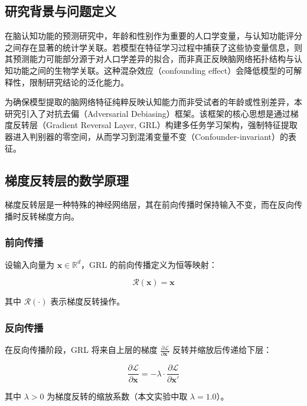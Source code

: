 \documentclass[UTF8, a4paper, 12pt]{article}
\begin{document}
\subsection{研究背景与问题定义}

在脑认知功能的预测研究中，年龄和性别作为重要的人口学变量，与认知功能评分之间存在显著的统计学关联。若模型在特征学习过程中捕获了这些协变量信息，则其预测能力可能部分源于对人口学差异的拟合，而非真正反映脑网络拓扑结构与认知功能之间的生物学关联。这种混杂效应（confounding effect）会降低模型的可解释性，限制研究结论的泛化能力。

为确保模型提取的脑网络特征纯粹反映认知能力而非受试者的年龄或性别差异，本研究引入了对抗去偏（Adversarial Debiasing）框架。该框架的核心思想是通过梯度反转层（Gradient Reversal Layer, GRL）构建多任务学习架构，强制特征提取器进入判别器的零空间，从而学习到混淆变量不变（Confounder-invariant）的表征。

\subsection{梯度反转层的数学原理}

梯度反转层是一种特殊的神经网络层，其在前向传播时保持输入不变，而在反向传播时反转梯度方向。

\subsubsection{前向传播}

设输入向量为 $\mathbf{x} \in \mathbb{R}^d$，GRL 的前向传播定义为恒等映射：

\begin{equation}
\mathcal{R}(\mathbf{x}) = \mathbf{x}
\end{equation}

其中 $\mathcal{R}(\cdot)$ 表示梯度反转操作。

\subsubsection{反向传播}

在反向传播阶段，GRL 将来自上层的梯度 $\frac{\partial \mathcal{L}}{\partial \mathbf{x}'}$ 反转并缩放后传递给下层：

\begin{equation}
\frac{\partial \mathcal{L}}{\partial \mathbf{x}} = -\lambda \cdot \frac{\partial \mathcal{L}}{\partial \mathbf{x}'}
\end{equation}

其中 $\lambda > 0$ 为梯度反转的缩放系数（本文实验中取 $\lambda = 1.0$）。
\end{document}
